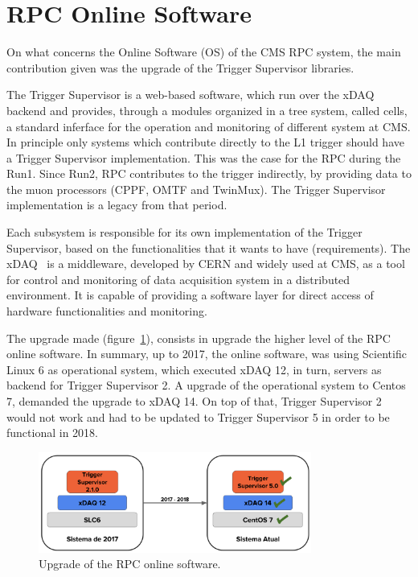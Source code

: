 \section{RPC Online Software}

On what concerns the Online Software (OS) of the CMS RPC system, the main contribution given was the upgrade of the Trigger Supervisor libraries.

The Trigger Supervisor is a web-based software, which run over the xDAQ backend and provides, through a modules organized in a tree system, called cells, a standard inferface for the operation and monitoring of different system at CMS. In principle only systems which contribute directly to the L1 trigger should have a Trigger Supervisor implementation. This was the case for the  RPC during the Run1. Since Run2, RPC contributes to the trigger indirectly, by providing data to the muon processors (CPPF, OMTF and TwinMux). The Trigger Supervisor implementation is a legacy from that period.

Each subsystem is responsible for its own implementation of the Trigger Supervisor, based on the functionalities that it wants to have (requirements). The xDAQ~\cite{xdaq} is a middleware, developed by CERN and widely used at CMS, as a tool for control and monitoring of data acquisition system in a distributed environment. It is capable of providing a software layer for direct access of hardware functionalities and monitoring.

The upgrade made (figure~\ref{ts_upgrade}), consists in upgrade the higher level of the RPC online software. In summary, up to 2017, the online software, was using Scientific Linux 6 as operational system, which executed xDAQ 12, in turn, servers as backend for Trigger Supervisor 2. A upgrade of the operational system to Centos 7, demanded the upgrade to xDAQ 14. On top of that, Trigger Supervisor 2 would not work and had to be updated to Trigger Supervisor 5 in order to be functional in 2018.

\begin{figure}[h]
\begin{center}
\includegraphics[width=0.8\textwidth,keepaspectratio]{figures/rpc/ts_upgrade.png}
\end{center}
\caption{Upgrade of the RPC online software.}\label{ts_upgrade}
\end{figure}

